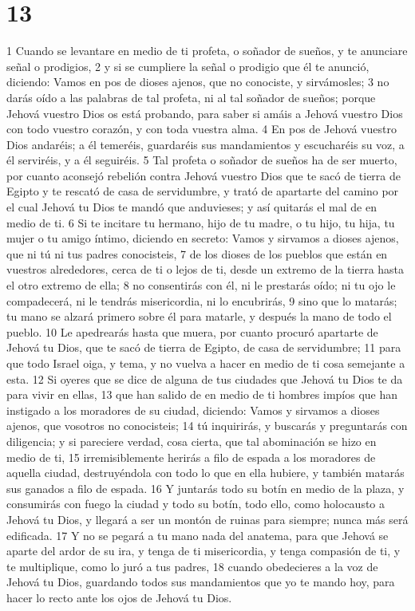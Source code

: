 \chapter{13}

1 Cuando se levantare en medio de ti profeta, o soñador de sueños, y te anunciare señal o prodigios,
2 y si se cumpliere la señal o prodigio que él te anunció, diciendo: Vamos en pos de dioses ajenos, que no conociste, y sirvámosles;
3 no darás oído a las palabras de tal profeta, ni al tal soñador de sueños; porque Jehová vuestro Dios os está probando, para saber si amáis a Jehová vuestro Dios con todo vuestro corazón, y con toda vuestra alma.
4 En pos de Jehová vuestro Dios andaréis; a él temeréis, guardaréis sus mandamientos y escucharéis su voz, a él serviréis, y a él seguiréis.
5 Tal profeta o soñador de sueños ha de ser muerto, por cuanto aconsejó rebelión contra Jehová vuestro Dios que te sacó de tierra de Egipto y te rescató de casa de servidumbre, y trató de apartarte del camino por el cual Jehová tu Dios te mandó que anduvieses; y así quitarás el mal de en medio de ti.
6 Si te incitare tu hermano, hijo de tu madre, o tu hijo, tu hija, tu mujer o tu amigo íntimo, diciendo en secreto: Vamos y sirvamos a dioses ajenos, que ni tú ni tus padres conocisteis,
7 de los dioses de los pueblos que están en vuestros alrededores, cerca de ti o lejos de ti, desde un extremo de la tierra hasta el otro extremo de ella;
8 no consentirás con él, ni le prestarás oído; ni tu ojo le compadecerá, ni le tendrás misericordia, ni lo encubrirás,
9 sino que lo matarás; tu mano se alzará primero sobre él para matarle, y después la mano de todo el pueblo.
10 Le apedrearás hasta que muera, por cuanto procuró apartarte de Jehová tu Dios, que te sacó de tierra de Egipto, de casa de servidumbre;
11 para que todo Israel oiga, y tema, y no vuelva a hacer en medio de ti cosa semejante a esta.
12 Si oyeres que se dice de alguna de tus ciudades que Jehová tu Dios te da para vivir en ellas,
13 que han salido de en medio de ti hombres impíos que han instigado a los moradores de su ciudad, diciendo: Vamos y sirvamos a dioses ajenos, que vosotros no conocisteis;
14 tú inquirirás, y buscarás y preguntarás con diligencia; y si pareciere verdad, cosa cierta, que tal abominación se hizo en medio de ti,
15 irremisiblemente herirás a filo de espada a los moradores de aquella ciudad, destruyéndola con todo lo que en ella hubiere, y también matarás sus ganados a filo de espada.
16 Y juntarás todo su botín en medio de la plaza, y consumirás con fuego la ciudad y todo su botín, todo ello, como holocausto a Jehová tu Dios, y llegará a ser un montón de ruinas para siempre; nunca más será edificada.
17 Y no se pegará a tu mano nada del anatema, para que Jehová se aparte del ardor de su ira, y tenga de ti misericordia, y tenga compasión de ti, y te multiplique, como lo juró a tus padres,
18 cuando obedecieres a la voz de Jehová tu Dios, guardando todos sus mandamientos que yo te mando hoy, para hacer lo recto ante los ojos de Jehová tu Dios.


